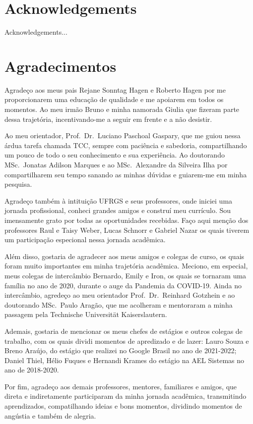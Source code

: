 \chapter*{Acknowledgements}

Acknowledgements...

\chapter*{Agradecimentos}

Agradeço aos meus pais Rejane Sonntag Hagen e Roberto Hagen por me proporcionarem uma educação de qualidade e me apoiarem em todos os momentos. Ao meu irmão Bruno e minha namorada Giulia que fizeram parte dessa trajetória, incentivando-me a seguir em frente e a não desistir.

Ao meu orientador, Prof.~Dr.~Luciano Paschoal Gaspary, que me guiou nessa árdua tarefa chamada TCC, sempre com paciência e sabedoria, compartilhando um pouco de todo o seu conhecimento e sua experiência. Ao doutorando MSc.~Jonatas Adilson Marques e ao MSc.~Alexandre da Silveira Ilha por compartilharem seu tempo sanando as minhas dúvidas e guiarem-me em minha pesquisa.

Agradeço também à intituição UFRGS e seus professores, onde iniciei uma jornada profissional, conheci grandes amigos e construí meu currículo. Sou imensamente grato por todas as oportunidades recebidas. Faço aqui menção dos professores Raul e Taisy Weber, Lucas Schnorr e Gabriel Nazar os quais tiverem um participação especional nessa jornada acadêmica.

Além disso, gostaria de agradecer aos meus amigos e colegas de curso, os quais foram muito importantes em minha trajetória acadêmica. Meciono, em especial, meus colegas de intercâmbio Bernardo, Emily e Iron, os quais se tornaram uma família no ano de 2020, durante o auge da Pandemia da COVID-19. Ainda no intercâmbio, agredeço ao meu orientador Prof.~Dr.~Reinhard Gotzhein e ao doutorando MSc.~Paulo Aragão, que me acolheram e mentoraram a minha passagem pela Technische Universität Kaiserslautern. 

Ademais, gostaria de mencionar os meus chefes de estágios e outros colegas de trabalho, com os quais dividi momentos de apredizado e de lazer: Lauro Souza e Breno Araújo, do estágio que realizei no Google Brasil no ano de 2021-2022; Daniel Thiel, Hélio Fuques e Hernandi Krames do estágio na AEL Sistemas no ano de 2018-2020.

Por fim, agradeço aos demais professores, mentores, familiares e amigos, que direta e indiretamente participaram da minha jornada acadêmica, transmitindo aprendizados, compatilhando ideias e bons momentos, dividindo momentos de angústia e também de alegria.

\clearpage
